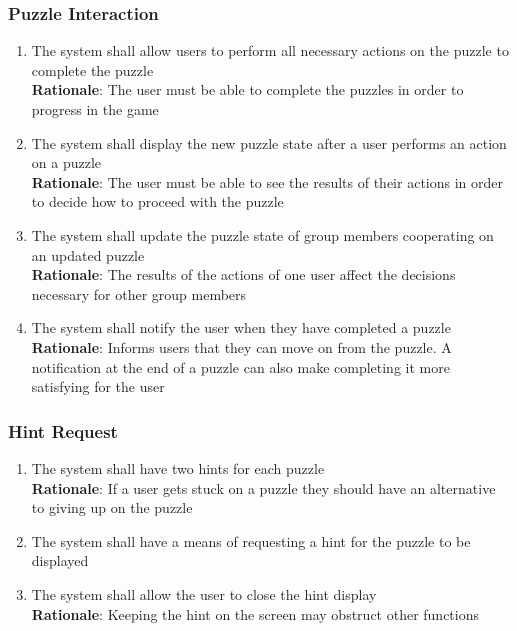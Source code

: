 \documentclass[12pt]{article}
\begin{document}
\subsubsection{Puzzle Interaction}
    \begin{enumerate}[label=PI\arabic*., series=PuzzleInteract]
        \item The system shall allow users to perform all necessary actions on the puzzle to complete the puzzle\\
        \textbf{Rationale}: The user must be able to complete the puzzles in order to progress in the game
        \item The system shall display the new puzzle state after a user performs an action on a puzzle\\
        \textbf{Rationale}: The user must be able to see the results of their actions in order to decide how to proceed with the puzzle
        \item The system shall update the puzzle state of group members cooperating on an updated puzzle\\
        \textbf{Rationale}: The results of the actions of one user affect the decisions necessary for other group members
        \item The system shall notify the user when they have completed a puzzle\\
        \textbf{Rationale}: Informs users that they can move on from the puzzle. A notification at the end of a puzzle can also make completing it more satisfying for the user
    \end{enumerate}
\subsubsection{Hint Request}
    \begin{enumerate}[label=HR\arabic*., series=HintRequest]
        \item The system shall have two hints for each puzzle\\
        \textbf{Rationale}: If a user gets stuck on a puzzle they should have an alternative to giving up on the puzzle
        \item The system shall have a means of requesting a hint for the puzzle to be displayed
        \item The system shall allow the user to close the hint display\\
        \textbf{Rationale}: Keeping the hint on the screen may obstruct other functions
    \end{enumerate}
\end{document}
